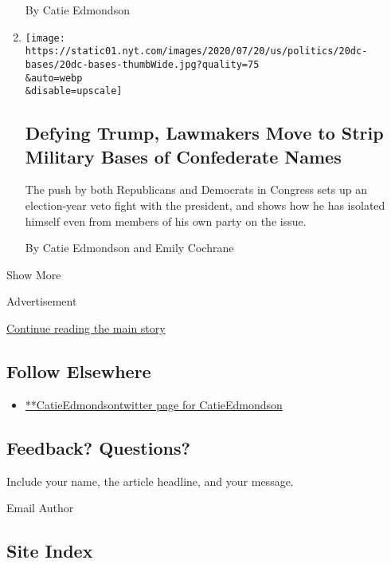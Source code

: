 \begin{enumerate}
  By Catie Edmondson
\item
  \href{/2020/07/20/us/politics/congress-trump-confederate-base-names.html}{}

  \texttt{[image: https://static01.nyt.com/images/2020/07/20/us/politics/20dc-bases/20dc-bases-thumbWide.jpg?quality=75\\\&auto=webp\\\&disable=upscale]}

  \hypertarget{defying-trump-lawmakers-move-to-strip-military-bases-of-confederate-names}{%
  \subsection{Defying Trump, Lawmakers Move to Strip Military Bases of
  Confederate
  Names}\label{defying-trump-lawmakers-move-to-strip-military-bases-of-confederate-names}}

  The push by both Republicans and Democrats in Congress sets up an
  election-year veto fight with the president, and shows how he has
  isolated himself even from members of his own party on the issue.

  By Catie Edmondson and Emily Cochrane
\end{enumerate}

Show More

Advertisement

\protect\hyperlink{after-mid2}{Continue reading the main story}

\hypertarget{follow-elsewhere}{%
\subsection{Follow Elsewhere}\label{follow-elsewhere}}

\begin{itemize}
\tightlist
\item
  \href{https://twitter.com/CatieEdmondson}{**CatieEdmondsontwitter page
  for CatieEdmondson}
\end{itemize}

\hypertarget{feedback-questions}{%
\subsection{Feedback? Questions?}\label{feedback-questions}}

Include your name, the article headline, and your message.

Email Author

\hypertarget{site-index}{%
\subsection{Site Index}\label{site-index}}

